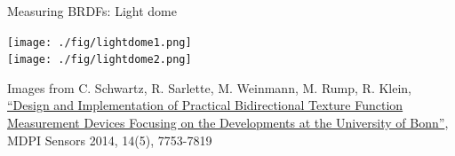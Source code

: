 \documentclass[utf8,stillsansserifmath,fleqn,t]{beamer}
\begin{document}
\begin{frame}
\frametitle{\insertsection}
Measuring BRDFs: Light dome\\
\begin{minipage}{.44\textwidth}
\texttt{[image: ./fig/lightdome1.png]}\\
\texttt{[image: ./fig/lightdome2.png]}
\end{minipage}\hfill
\begin{minipage}{.49\textwidth}
\tiny Images from C. Schwartz, R. Sarlette, M. Weinmann, M. Rump, R. Klein,
\href{https://doi.org/10.3390/s140507753}{``Design and Implementation of Practical Bidirectional Texture Function
Measurement Devices Focusing on the Developments at the University of Bonn''},
MDPI Sensors 2014, 14(5), 7753-7819
\end{minipage}
\end{frame}
\end{document}
